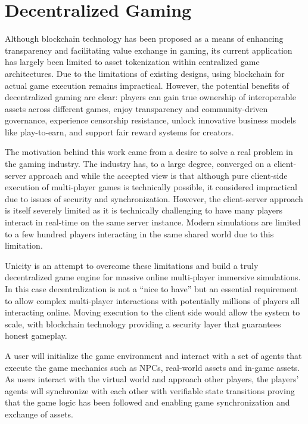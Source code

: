 \documentclass{article}
\begin{document}
\section{Decentralized Gaming}

Although blockchain technology has been proposed as a means of enhancing transparency and facilitating value exchange in gaming, its current application has largely been limited to asset tokenization within centralized game architectures. Due to the limitations of existing designs, using blockchain for actual game execution remains impractical. However, the potential benefits of decentralized gaming are clear: players can gain true ownership of interoperable assets across different games, enjoy transparency and community-driven governance, experience censorship resistance, unlock innovative business models like play-to-earn, and support fair reward systems for creators.

The motivation behind this work came from a desire to solve a real problem in the gaming industry. The industry has, to a large degree, converged on a client-server approach and while the accepted view is that although pure client-side execution of multi-player games is technically possible, it considered impractical due to issues of security and synchronization. However, the client-server approach is itself severely limited as it is technically challenging to have many players interact in real-time on the same server instance. Modern simulations are limited to a few hundred players interacting in the same shared world due to this limitation.

Unicity is an attempt to overcome these limitations and build a truly decentralized game engine for massive online multi-player immersive simulations. In this case decentralization is not a ``nice to have'' but an essential requirement to allow complex multi-player interactions with potentially millions of players all interacting online. Moving execution to the client side would allow the system to scale, with blockchain technology providing a security layer that guarantees honest gameplay.

A user will initialize the game environment and interact with a set of agents that execute the game mechanics such as NPCs, real-world assets and in-game assets. As users interact with the virtual world and approach other players, the players' agents will synchronize with each other with verifiable state transitions proving that the game logic has been followed and enabling game synchronization and exchange of assets.
\end{document}
